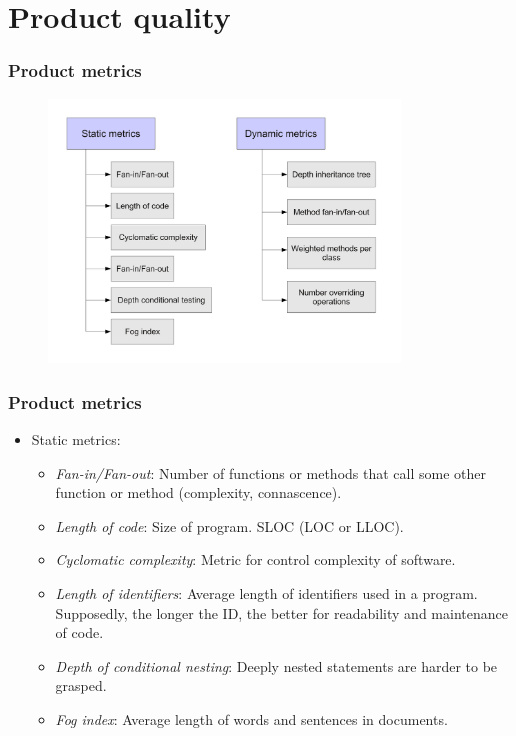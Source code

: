 \documentclass{beamer}
\begin{document}
\section{Product quality}


\begin{frame}
\frametitle{Product metrics}
\begin{center}
\begin{figure}
 \includegraphics[height=7cm]{figs/quality-product-metrics.pdf}
\end{figure}
\end{center}
\end{frame}


\begin{frame}
 \frametitle{Product metrics}
 \begin{itemize}
 \item Static metrics:
 \begin{itemize}
  \item \textit{Fan-in/Fan-out}: Number of functions or methods that call some other
function or method (complexity, connascence).
  \item \textit{Length of code}: Size of program. SLOC (LOC or LLOC).
  \item \textit{Cyclomatic complexity}: Metric for control complexity of software.
  \item \textit{Length of identifiers}: Average length of identifiers used in a program.
Supposedly, the longer the ID, the better for readability and maintenance of code.
  \item \textit{Depth of conditional nesting}: Deeply nested statements are harder to be grasped.
  \item \textit{Fog index}: Average length of words and sentences in documents.
 \end{itemize}

 \end{itemize}
\end{frame}
\end{document}
